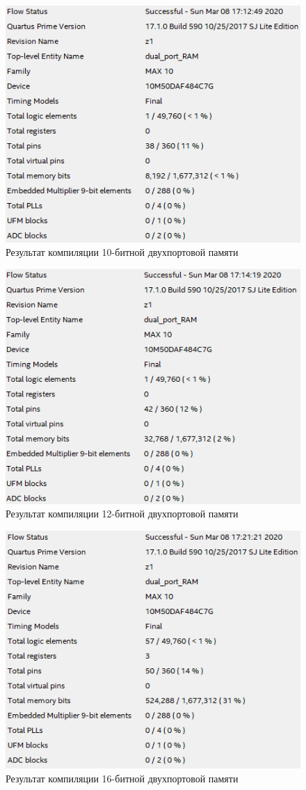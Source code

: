 \documentclass[a4paper,14pt]{article}
\begin{document}
	\begin{figure}[H]
		\centering
		\includegraphics[width=0.8\linewidth]{images/z4_res_10bit}
		\caption{Результат компиляции 10-битной двухпортовой памяти}
		\label{fig:z4_res_10bit}
	\end{figure}

	\begin{figure}[H]
		\centering
		\includegraphics[width=0.8\linewidth]{images/z4_res_12bit}
		\caption{Результат компиляции 12-битной двухпортовой памяти}
		\label{fig:z4_res_12bit}
	\end{figure}
	
	\begin{figure}[H]
		\centering
		\includegraphics[width=0.8\linewidth]{images/z4_res_16bit}
		\caption{Результат компиляции 16-битной двухпортовой памяти}
		\label{fig:z4_res_16bit}
	\end{figure}
\end{document}
